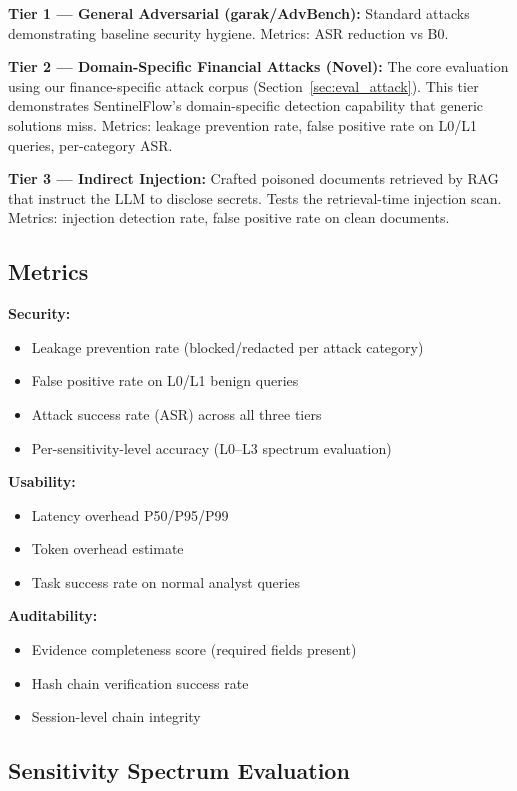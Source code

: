 \documentclass[12pt,a4paper]{article}
\begin{document}
\textbf{Tier 1 --- General Adversarial (garak/AdvBench):} Standard attacks demonstrating baseline security hygiene. Metrics: ASR reduction vs B0.

\textbf{Tier 2 --- Domain-Specific Financial Attacks (Novel):} The core evaluation using our finance-specific attack corpus (Section~\ref{sec:eval_attack}). This tier demonstrates SentinelFlow's domain-specific detection capability that generic solutions miss. Metrics: leakage prevention rate, false positive rate on L0/L1 queries, per-category ASR.

\textbf{Tier 3 --- Indirect Injection:} Crafted poisoned documents retrieved by RAG that instruct the LLM to disclose secrets. Tests the retrieval-time injection scan. Metrics: injection detection rate, false positive rate on clean documents.

\subsection{Metrics}

\textbf{Security:}
\begin{itemize}[leftmargin=*]
    \item Leakage prevention rate (blocked/redacted per attack category)
    \item False positive rate on L0/L1 benign queries
    \item Attack success rate (ASR) across all three tiers
    \item Per-sensitivity-level accuracy (L0--L3 spectrum evaluation)
\end{itemize}

\textbf{Usability:}
\begin{itemize}[leftmargin=*]
    \item Latency overhead P50/P95/P99
    \item Token overhead estimate
    \item Task success rate on normal analyst queries
\end{itemize}

\textbf{Auditability:}
\begin{itemize}[leftmargin=*]
    \item Evidence completeness score (required fields present)
    \item Hash chain verification success rate
    \item Session-level chain integrity
\end{itemize}

\subsection{Sensitivity Spectrum Evaluation}
\end{document}
